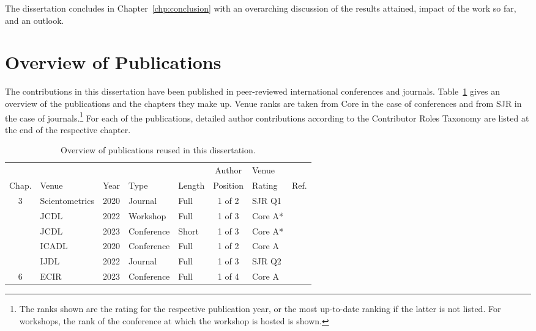 The dissertation concludes in Chapter~\ref{chp:conclusion} with an overarching discussion of the results attained, impact of the work so far, and an outlook.

\section{Overview of Publications}

The contributions in this dissertation have been published in peer-reviewed international conferences and journals. Table~\ref{tab:primarypublicationoverview} gives an overview of the publications and the chapters they make up. Venue ranks are taken from Core in the case of conferences and from SJR in the case of journals.\footnote{The ranks shown are the rating for the respective publication year, or the most up-to-date ranking if the latter is not listed. For workshops, the rank of the conference at which the workshop is hosted is shown.} For each of the publications, detailed author contributions according to the Contributor Roles Taxonomy are listed at the end of the respective chapter.

\begin{table}[h]
\centering
  \caption{Overview of publications reused in this dissertation.}
  \label{tab:primarypublicationoverview}
  \begin{tabular}{cllllclr}
    \hline
    \ & \ & \ & \ & \ & Author & Venue & \ \\
    Chap. & Venue & Year & Type & Length & Position & Rating & Ref. \\
    \hline
    3 & Scientometrics & 2020 & Journal & Full & 1 of 2 & SJR Q1 & \cite{Saier2020} \\
    \arrayrulecolor{lightgrey}\cline{1-8}
    \multirow{2}{*}{4} & JCDL & 2022 & Workshop & Full & 1 of 3 & Core A* & \cite{Saier2022ULITE} \\
    \ & JCDL & 2023 & Conference & Short & 1 of 3 & Core A* & \cite{Saier2023unarXive} \\
    \arrayrulecolor{lightgrey}\cline{1-8}
    \multirow{2}{*}{5} & ICADL & 2020 & Conference & Full & 1 of 2 & Core A & \cite{Saier2020xling} \\
    \ & IJDL & 2022 & Journal & Full & 1 of 3 & SJR Q2 & \cite{Saier2021} \\
    \arrayrulecolor{lightgrey}\cline{1-8}\arrayrulecolor{black}
    6 & ECIR & 2023 & Conference & Full & 1 of 4 & Core A & \cite{Saier2023hyperpie} \\
    \hline
    \end{tabular}
\end{table}

